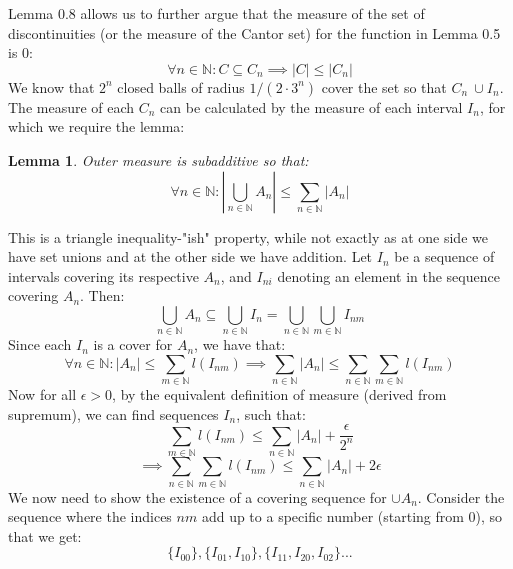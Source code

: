 \documentclass[10pt,letterpaper]{article} %
\newtheorem{lem}{Lemma}[section]
\begin{document}
Lemma 0.8 allows us to further argue that the measure of the set of discontinuities (or the measure of the Cantor set) for the function in Lemma 0.5 is 0:
\begin{equation*}
  \forall n \in \mathbb{N}: C \subseteq C_n \implies |C| \leqslant |C_n|
\end{equation*}
We know that $2^n$ closed balls of radius $1/(2\cdot 3^{n})$ cover the set so that $C_n \ \cup I_n$. The measure of each $C_n$ can be calculated by the measure of each interval $I_n$, for which we require the lemma:
\begin{lem}
Outer measure is subadditive so that:
\begin{equation*}
  \forall n \in \mathbb{N}: \left|\bigcup_{n \in \mathbb{N}}A_n\right| \leqslant \sum_{n \in \mathbb{N}}|A_n|
\end{equation*}
\end{lem}
This is a triangle inequality-"ish" property, while not exactly as at one side we have set unions and at the other side we have addition. Let $\textit{I}_n$ be a sequence of intervals covering its respective $A_n$, and $I_{ni}$ denoting an element in the sequence covering $A_n$. Then:
\begin{equation*}
  \bigcup_{n \in \mathbb{N}} A_n \subseteq \bigcup_{n \in \mathbb{N}}\textit{I}_n = \bigcup_{n \in \mathbb{N}}\bigcup_{m \in \mathbb{N}}I_{nm}
\end{equation*}
Since each $\textit{I}_n$ is a cover for $A_n$, we have that:
\begin{equation*}
  \forall n \in \mathbb{N}: |A_n| \leqslant \sum_{m \in \mathbb{N}}l(I_{nm}) \implies \sum_{n \in \mathbb{N}} |A_n| \leqslant \sum_{n \in \mathbb{N}}\sum_{m \in \mathbb{N}}l(I_{nm})
\end{equation*}
Now for all $\epsilon > 0$, by the equivalent definition of measure (derived from supremum), we can find sequences $\textit{I}_n$, such that:
\begin{equation*}
  \sum_{m \in \mathbb{N}}l(I_{nm}) \leqslant \sum_{n \in \mathbb{N}}|A_n| + \frac{\epsilon}{2^n}
\end{equation*} 
\begin{equation*}
  \implies \sum_{n \in \mathbb{N}}\sum_{m \in \mathbb{N}}l(I_{nm}) \leqslant \sum_{n \in \mathbb{N}}|A_n| + 2\epsilon
\end{equation*}
We now need to show the existence of a covering sequence for $\cup A_n$. Consider the sequence where the indices $nm$ add up to a specific number (starting from $0$), so that we get:
\begin{equation*}
  \{I_{00}\}, \{I_{01}, I_{10}\}, \{I_{11}, I_{20}, I_{02}\}...
\end{equation*}
\end{document}
